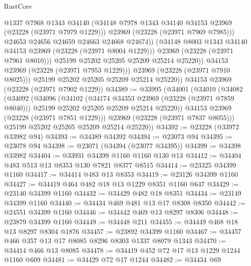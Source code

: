 \begin{lexlean}{RustCore}
\begin{coremodule}
                        @1337
                        @7968
                        @1343
                        @34140
                        (@34148 @7978 @1343 @34140 @34153 @23969 (@23228 (@23971 @7979 @1229)))
                        @23969
                        (@23228 (@23971 @7969 @7985)))
                      @24653
                      @24656
                      @24659
                      @24663
                      @24668
                      @24674))
                  (@34148 @8003 @1343 @34140 @34153 @23969 (@23228 (@23971 @8004 @1229)))
                  @23969
                  (@23228 (@23971 @7961 @8010)))
                @25199
                @25202
                @25205
                @25209
                @25214
                @25220))
            @34153
            @23969
            (@23228 (@23971 @7953 @1229)))
          @23969
          (@23228 (@23971 @7910 @8025)))
        @25199
        @25202
        @25205
        @25209
        @25214
        @25220))
    @34153
    @23969
    (@23228 (@23971 @7902 @1229))
@34389 := @33995
    (@34001
      (@34010
        (@34082
          (@34092
            (@34096
              (@34102
                (@34174 @34353 @23969 (@23228 (@23971 @7859 @8040)))
                @25199
                @25202
                @25205
                @25209
                @25214
                @25220))
            @34153
            @23969
            (@23228 (@23971 @7851 @1229)))
          @23969
          (@23228 (@23971 @7837 @8055)))
        @25199
        @25202
        @25205
        @25209
        @25214
        @25220))
@34392 := @23228 (@33972 @33982 @94)
@34393 := @34389 @34392
@34394 := @23073 @94
@34395 := @23078 @94
@34398 := @23071 (@34394 (@23077 @34395))
@34399 := @34398 @33982
@34404 := @33931 @34399 @1160 @1160 @130 @13
@34412 := @34404 @483 @513 @13 @8353 @130 @7821 @8377 @8515
@34414 := @23325 @34399 @1160
@34417 := @34414 @483 @13 @8353
@34419 := @23126 @34399 @1160
@34427 := @34419 @464 @482 @18 @13 @1229 @8351 @1160 @647
@34429 := @23140 @34399 @1160
@34432 := @34429 @482 @18 @8351
@34434 := @23149 @34399 @1160
@34440 := @34434 @469 @481 @13 @17 @8308 @8350
@34442 := @24551 @34399 @1160
@34446 := @34442 @469 @13 @8297 @8306
@34448 := @23879 @34399 @1160
@34449 := @34448 @211
@34455 := @34449 @468 @18 @13 @8297 @8304 @1876
@34457 := @23892 @34399 @1160
@34467 := @34457 @466 @357 @13 @17 @8085 @8296 @8303 @1337 @8079 @1343
@34470 := @34414 @466 @13 @8085
@34478 := @34419 @452 @72 @17 @13 @1229 @1244 @1160 @609
@34481 := @34429 @72 @17 @1244
@34482 := @34434 @69

\end{coremodule}
\end{lexlean}
